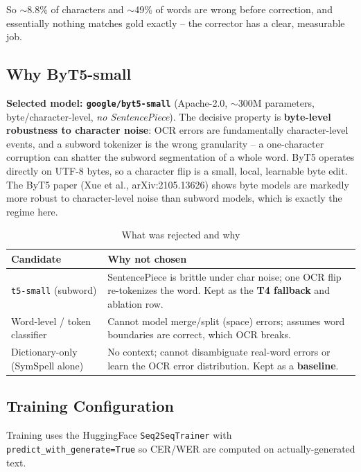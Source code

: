 \documentclass[12pt,a4paper]{article}
\begin{document}
So $\sim$8.8\% of characters and $\sim$49\% of words are wrong before correction, and essentially nothing matches gold exactly -- the corrector has a clear, measurable job.

\subsection{Why ByT5-small}

\textbf{Selected model: \texttt{google/byt5-small}} (Apache-2.0, $\sim$300M parameters, byte/character-level, \emph{no SentencePiece}). The decisive property is \textbf{byte-level robustness to character noise}: OCR errors are fundamentally character-level events, and a subword tokenizer is the wrong granularity -- a one-character corruption can shatter the subword segmentation of a whole word. ByT5 operates directly on UTF-8 bytes, so a character flip is a small, local, learnable byte edit. The ByT5 paper (Xue et al., arXiv:2105.13626) shows byte models are markedly more robust to character-level noise than subword models, which is exactly the regime here.

\begin{table}[H]
\centering
\caption{What was rejected and why}
\small
\begin{tabularx}{\linewidth}{@{} l L @{}}
\toprule
\textbf{Candidate} & \textbf{Why not chosen} \\
\midrule
\texttt{t5-small} (subword) & SentencePiece is brittle under char noise; one OCR flip re-tokenizes the word. Kept as the \textbf{T4 fallback} and ablation row. \\
Word-level / token classifier & Cannot model merge/split (space) errors; assumes word boundaries are correct, which OCR breaks. \\
Dictionary-only (SymSpell alone) & No context; cannot disambiguate real-word errors or learn the OCR error distribution. Kept as a \textbf{baseline}. \\
\bottomrule
\end{tabularx}
\end{table}

\subsection{Training Configuration}

Training uses the HuggingFace \texttt{Seq2SeqTrainer} with \texttt{predict\_with\_generate=True} so CER/WER are computed on actually-generated text.
\end{document}

